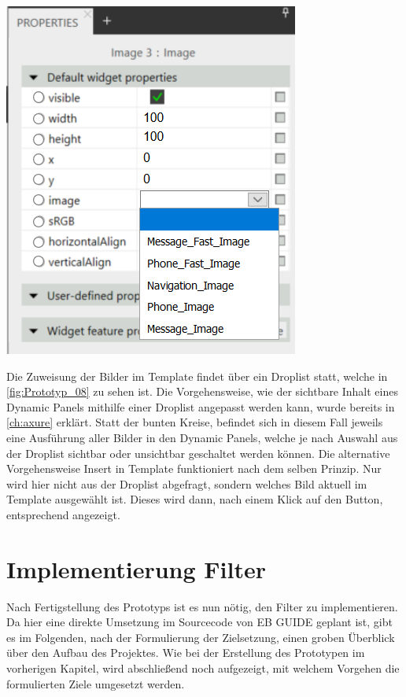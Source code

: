 \begin{center}
  \includegraphics[scale=0.6]{figures/Prototyp_08.PNG}
  \label{fig:Prototyp_08}
\end{center}

Die Zuweisung der Bilder im Template findet über ein Droplist statt, welche in \cref{fig:Prototyp_08} zu sehen ist.
Die Vorgehensweise, wie der sichtbare Inhalt eines Dynamic Panels mithilfe einer Droplist angepasst werden kann, wurde bereits in \cref{ch:axure} erklärt.
Statt der bunten Kreise, befindet sich in diesem Fall jeweils eine Ausführung aller Bilder in den Dynamic Panels, welche je nach Auswahl aus der Droplist sichtbar oder unsichtbar geschaltet werden können.
Die alternative Vorgehensweise \glqq Insert in Template\grqq{} funktioniert nach dem selben Prinzip.
Nur wird hier nicht aus der Droplist abgefragt, sondern welches Bild aktuell im Template ausgewählt ist.
Dieses wird dann, nach einem Klick auf den Button, entsprechend angezeigt.


\section {Implementierung Filter}
Nach Fertigstellung des Prototyps ist es nun nötig, den Filter zu implementieren.
Da hier eine direkte Umsetzung im Sourcecode von EB GUIDE geplant ist, gibt es im Folgenden, nach der Formulierung der Zielsetzung,  einen groben Überblick über den Aufbau des Projektes.
Wie bei der Erstellung des Prototypen im vorherigen Kapitel, wird abschließend noch aufgezeigt, mit welchem Vorgehen die formulierten Ziele umgesetzt werden.

